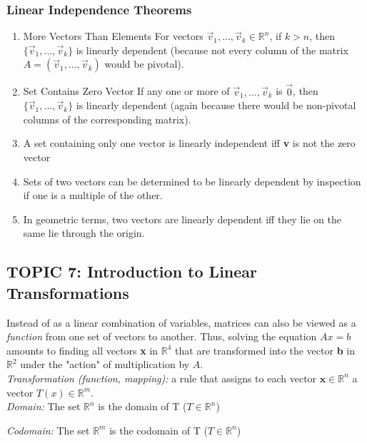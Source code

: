 \documentclass[12pt]{article} %
\newcommand{\R}{\mathbb{R}}
\begin{document}
\subsubsection{Linear Independence Theorems}
\begin{enumerate}
	\item More Vectors Than Elements
		\indent For vectors $\vec{v}_1, ..., \vec{v}_k \in \R^n$, if $k > n$, then $\{\vec{v}_1, ..., \vec{v}_k\}$ is linearly dependent (because not every column of the matrix $A = (\vec{v}_1, ..., \vec{v}_k)$ would be pivotal). 
	\item Set Contains Zero Vector
		\indent If any one or more of $\vec{v}_1, ..., \vec{v}_k$ is $\vec{0}$, then $\{\vec{v}_1, ..., \vec{v}_k\}$ is linearly dependent (again because there would be non-pivotal columns of the corresponding matrix).
	\item A set containing only one vector is linearly independent iff \textbf{v} is not the zero vector
	\item Sets of two vectors can be determined to be linearly dependent by inspection if one is a multiple of the other.
	\item In geometric terms, two vectors are linearly dependent iff they lie on the same lie through the origin.
\end{enumerate}


\subsection{TOPIC 7: Introduction to Linear Transformations}
Instead of as a linear combination of variables, matrices can also be viewed as a \emph{function} from one set of vectors to another. Thus, solving the equation $Ax=b$ amounts to finding all vectors \textbf{x} in $\R^4$ that are transformed into the vector \textbf{b} in $\R^2$ under the "action" of multiplication by $A$.\\ 

\emph{Transformation (function, mapping):} a rule that assigns to each vector $\mathbf{x} \in \R^n$ a vector $T(x) \in \R^m$. \\

\emph{Domain:} The set $\R^n$ is the domain of T ($T \in \R^n$)

\emph{Codomain:} The set $\R^m$ is the codomain of T ($T \in \R^n$)\\
\end{document}
